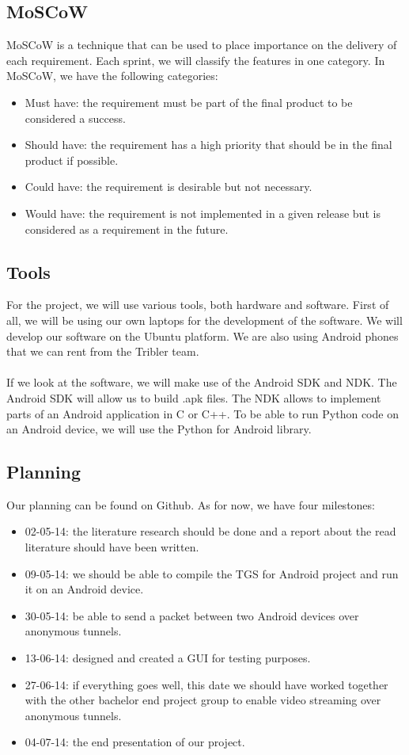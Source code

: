 \subsection{MoSCoW}
MoSCoW is a technique that can be used to place importance on the delivery of each requirement. Each sprint, we will classify the features in one category. In MoSCoW, we have the following categories:
\begin{itemize}
\item Must have: the requirement must be part of the final product to be considered a success.
\item Should have: the requirement has a high priority that should be in the final product if possible.
\item Could have: the requirement is desirable but not necessary.
\item Would have: the requirement is not implemented in a given release but is considered as a requirement in the future.
\end{itemize}

\subsection{Tools}
For the project, we will use various tools, both hardware and software. First of all, we will be using our own laptops for the development of the software. We will develop our software on the Ubuntu platform. We are also using Android phones that we can rent from the Tribler team.\\\\
If we look at the software, we will make use of the Android SDK and NDK. The Android SDK will allow us to build .apk files. The NDK allows to implement parts of an Android application in C or C++. To be able to run Python code on an Android device, we will use the Python for Android library.

\subsection{Planning}
Our planning can be found on Github. As for now, we have four milestones:
\begin{itemize}
\item 02-05-14: the literature research should be done and a report about the read literature should have been written.
\item 09-05-14: we should be able to compile the TGS for Android project and run it on an Android device.
\item 30-05-14: be able to send a packet between two Android devices over anonymous tunnels.
\item 13-06-14: designed and created a GUI for testing purposes.
\item 27-06-14: if everything goes well, this date we should have worked together with the other bachelor end project group to enable video streaming over anonymous tunnels.
\item 04-07-14: the end presentation of our project.
\end{itemize}

